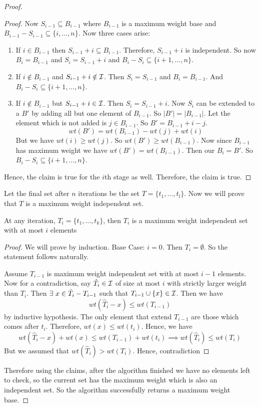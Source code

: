 \begin{proof}
\begin{claimwidth}
\begin{proof}
	Now $S_{i-1}\subseteq B_{i-1}$ where $B_{i-1}$ is a maximum weight base and $B_{i-1}-S_{i-1}\subseteq \{i,\dots, n\}$. Now three cases arise:
	\begin{enumerate}[label=\bfseries Case \arabic*:,leftmargin=1.5cm]
		\item If $i\in B_{i-1}$ then $S_{i-1}+i\subseteq B_{i-1}$. Therefore, $S_{i-1}+i$ is independent. So now $B_i=B_{i-1}$ and $S_i=S_{i-1}+i$ and $B_i-S_i\subseteq \{i+1,\dots, n\}$.
		\item If $i\notin B_{i-1}$ and $S_{i-1}+i\notin \mathcal{I}$. Then $S_i=S_{i-1}$ and $B_i=B_{i-1}$. And $B_i-S_i\subseteq \{i+1,\dots , n\}$.
		\item If $i\notin B_{i-1}$ but $S_{i-1}+i\in \mathcal{I}$. Then $S_i=S_{i-1}+i$. Now $S_i$ can be extended to a $B'$ by adding all but one element of $B_{i-1}$. So $|B'|=|B_{i-1}|$. Let the element which is not added is $j\in B_{i-1}$. So $B'=B_{i-1}+i-j$. $$wt(B')=wt(B_{i-1})-wt(j)+wt(i)$$But we have $wt(i)\geq wt(j)$. So $wt(B')\geq wt(B_{i-1})$. Now since $B_{i-1}$ has maximum weight we have $wt(B')=wt(B_{i-1})$. Then our $B_i=B'$. So $B_i-S_i\subseteq \{i+1,\dots, n\}$.
	\end{enumerate}
	Hence, the claim is true for the $i$th stage as well. Therefore, the claim is true.
\end{proof}
\end{claimwidth}
Let the final set after $n$ iterations be the set $T=\{t_1,\dots, t_l\}$. Now we will prove that $T$ is a maximum weight independent set.
\begin{claimwidth}
	\begin{claim}{}{}
	At any iteration, $T_i=\{t_1,\dots, t_k\}$, then $T_i$ is a maximum weight independent set with at most $i$ elements
\end{claim}
\begin{proof}
	We will prove by induction. Base Case: $i=0$. Then $T_i=\emptyset$. So the statement follows naturally.
	
	Assume $T_{i-1}$ is maximum weight independent set with at most $i-1$ elements. Now for a contradiction, say $\hat{T}_i\in\mathcal{I}$ of size at most $i$ with strictly larger weight than $T_i$. Then $\exists\ x\in \hat{T_i}-T_{i-1}$ such that $T_{i-1}\cup \{x\}\in \mathcal{I}$. Then we have $$wt(\hat{T}_i-x)\leq wt(T_{i-1})$$by inductive hypothesis. The only element that extend $T_{i-1}$ are those which comes after $t_{i}$. Therefore, $wt(x)\leq wt(t_i)$. Hence, we have $$wt(\hat{T}_i-x)+wt(x)\leq wt(T_{i-1})+wt(t_i)\implies wt(\hat{T}_i)\leq wt(T_i)$$But we assumed that $wt(\hat{T}_i)>wt(T_i)$. Hence, contradiction \ctr
\end{proof}
\end{claimwidth}

	\parinn 
	
	Therefore using the claims, after the algorithm finished we have no elements left to check, so the current set has the maximum weight which is also an independent set. So the algorithm successfully returns a maximum weight base.
\end{proof}
